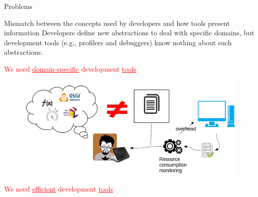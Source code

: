 \documentclass[10pt,xcolor={dvipsnames}]{beamer}
\begin{document}
	\begin{frame}{Problems}
		\vspace{-.3cm} 
		\begin{footnotesize}
			\begin{alertblock}{Mismatch between the concepts used by developers and how tools present information}
				Developers define new abstractions to deal with specific domains, but development tools (e.g., profilers and debuggers) know nothing about such abstractions. \\
				\begin{center}
					\textcolor{red}{\large We need \underline{domain-specific} development \underline{tools}}
				\end{center}
			\end{alertblock}
		\end{footnotesize}
		\begin{figure}
			\centering
			\includegraphics[scale=0.3]{fig/problems.png}
		\end{figure}
		\begin{center}
			\textcolor{red}{\large We need \underline{efficient} development \underline{tools}}
		\end{center}
	\end{frame}
	
\end{document}
